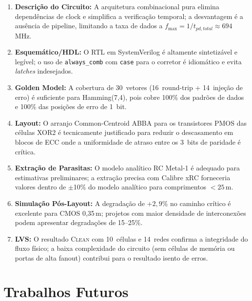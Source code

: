 \documentclass[12pt,a4paper]{article}
\begin{document}
\begin{unidadebox}
\begin{enumerate}[leftmargin=1.5em,label=\textbf{\arabic*.}]
  \item \textbf{Descrição do Circuito:} A arquitetura combinacional pura elimina dependências de clock e simplifica a verificação temporal; a desvantagem é a ausência de pipeline, limitando a taxa de dados a $f_{\max} = 1/t_{pd,total} \approx 694$\,MHz.
  \item \textbf{Esquemático/HDL:} O RTL em SystemVerilog é altamente sintetizável e legível; o uso de \texttt{always\_comb} com \texttt{case} para o corretor é idiomático e evita \textit{latches} indesejados.
  \item \textbf{Golden Model:} A cobertura de 30~vetores (16~round-trip + 14~injeção de erro) é suficiente para Hamming(7,4), pois cobre 100\% dos padrões de dados e 100\% das posições de erro de 1~bit.
  \item \textbf{Layout:} O arranjo Common-Centroid ABBA para os transistores PMOS das células XOR2 é tecnicamente justificado para reduzir o descasamento em blocos de ECC onde a uniformidade de atraso entre os 3~bits de paridade é crítica.
  \item \textbf{Extração de Parasitas:} O modelo analítico RC Metal-1 é adequado para estimativas preliminares; a extração precisa com Calibre xRC forneceria valores dentro de $\pm$10\% do modelo analítico para comprimentos $< 25$\,\textmu m.
  \item \textbf{Simulação Pós-Layout:} A degradação de $+2{,}9\%$ no caminho crítico é excelente para CMOS 0,35\,\textmu m; projetos com maior densidade de interconexões podem apresentar degradações de 15--25\%.
  \item \textbf{LVS:} O resultado \textsc{Clean} com 10~células e 14~redes confirma a integridade do fluxo físico; a baixa complexidade do circuito (sem células de memória ou portas de alta fanout) contribui para o resultado isento de erros.
\end{enumerate}
\end{unidadebox}

\section{Trabalhos Futuros}
\end{document}
